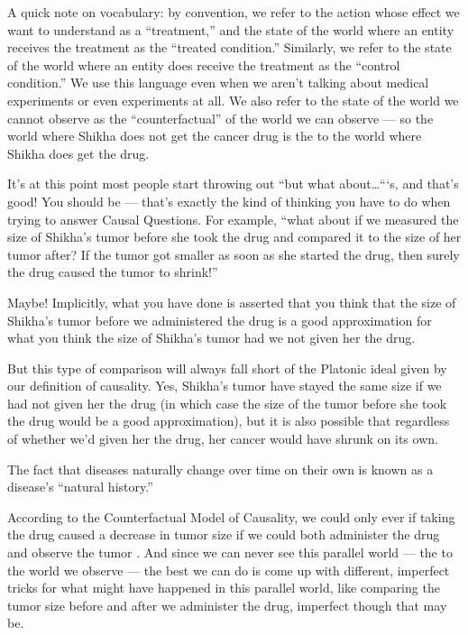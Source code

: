 \documentclass[letterpaper,10pt,english]{jupyterBook}
\begin{document}
\sphinxAtStartPar
A quick note on vocabulary: by convention, we refer to the action whose effect we want to understand as a “treatment,” and the state of the world where an entity receives the treatment as the “treated condition.” Similarly, we refer to the state of the world where an entity does  receive the treatment as the “control condition.” We use this language even when we aren’t talking about medical experiments or even experiments at all. We also refer to the state of the world we cannot observe as the “counterfactual” of the world we can observe — so the world where Shikha does not get the cancer drug is the  to the world where Shikha does get the drug.

\sphinxAtStartPar
It’s at this point most people start throwing out “but what about…“‘s, and that’s good! You should be — that’s exactly the kind of thinking you have to do when trying to answer Causal Questions. For example, “what about if we measured the size of Shikha’s tumor before she took the drug and compared it to the size of her tumor after? If the tumor got smaller as soon as she started the drug, then surely the drug caused the tumor to shrink!”

\sphinxAtStartPar
Maybe! Implicitly, what you have done is asserted that you think that the size of Shikha’s tumor before we administered the drug is a good approximation for what you think the size of Shikha’s tumor  had we not given her the drug.

\sphinxAtStartPar
But this type of comparison will always fall short of the Platonic ideal given by our definition of causality. Yes, Shikha’s tumor  have stayed the same size if we had not given her the drug (in which case the size of the tumor before she took the drug would be a good approximation), but it is also possible that regardless of whether we’d given her the drug, her cancer would have shrunk on its own.%
\begin{footnote}[1]\sphinxAtStartFootnote
The fact that diseases naturally change over time on their own is known as a disease’s “natural history.”
%
\end{footnote}

\sphinxAtStartPar
According to the Counterfactual Model of Causality, we could only ever  if taking the drug caused a decrease in tumor size if we could both administer the drug and observe the tumor . And since we can never see this parallel world — the  to the world we observe — the best we can do is come up with different, imperfect tricks for  what might have happened in this parallel world, like comparing the tumor size before and after we administer the drug, imperfect though that may be.
\end{document}
